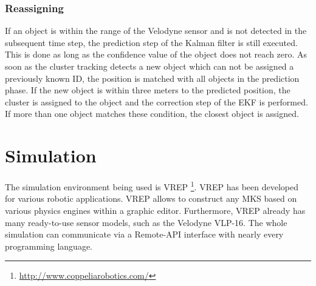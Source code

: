 \documentclass[11pt,oneside,openright]{mpreport}
\begin{document}
\subsection{Reassigning}

If an object is within the range of the Velodyne sensor and is not detected in the subsequent time step, the prediction step of the Kalman filter is still executed.
This is done as long as the confidence value of the object does not reach zero. As soon as the cluster tracking detects a new object which can not be assigned a previously known ID,
the position is matched with all objects in the prediction phase. If the new object is within three meters to the predicted position, the cluster is assigned to the object
and the correction step of the EKF is performed. If more than one object matches these condition, the closest object is assigned.

\chapter{Simulation}

The simulation environment being used is VREP \footnote{\url{http://www.coppeliarobotics.com/}}. VREP has been developed for various robotic applications.
VREP allows to construct any \ac{MKS} based on various physics engines within a graphic editor. Furthermore, VREP already has many ready-to-use sensor models, such as
the Velodyne VLP-16. The whole simulation can communicate via a Remote-API interface with nearly every programming language.
\end{document}
